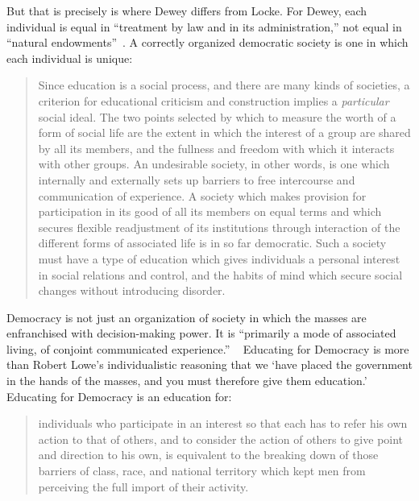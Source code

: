 But that is precisely is where Dewey differs from Locke. For Dewey, each individual is equal in ``treatment by law and in its administration,'' not equal in ``natural endowments''~\citep[p.]{Dewey:1937ut}. A correctly organized democratic society is one in which each individual is unique:

\begin{quote}

Since education is a social process, and there are many kinds of societies, a criterion for educational criticism and construction implies a \emph{particular} social ideal. The two points selected by which to measure the worth of a form of social life are the extent in which the interest of a group are shared by all its members, and the fullness and freedom with which it interacts with other groups. An undesirable society, in other words, is one which internally and externally sets up barriers to free intercourse and communication of experience. A society which makes provision for participation in its good of all its members on equal terms and which secures flexible readjustment of its institutions through interaction of the different forms of associated life is in so far democratic. Such a society must have a type of education which gives individuals a personal interest in social relations and control, and the habits of mind which secure social changes without introducing disorder. ~\citep[p. 115]{Dewey:1916tl}
\end{quote}

 Democracy is not just an organization of society in which the masses are enfranchised with decision-making power. It is ``primarily a mode of associated living, of conjoint communicated experience.'' ~\citep[p .101]{Dewey:1916tl} Educating for Democracy is more than Robert Lowe's individualistic reasoning that we `have placed the government in the hands of the masses, and you must therefore give them education.' Educating for Democracy is an education for:

\begin{quote}

individuals who participate in an interest so that each has to refer his own action to that of others, and to consider the action of others to give point and direction to his own, is equivalent to the breaking down of those barriers of class, race, and national territory which kept men from perceiving the full import of their activity. ~\citep[p .101]{Dewey:1916tl}
\end{quote}

